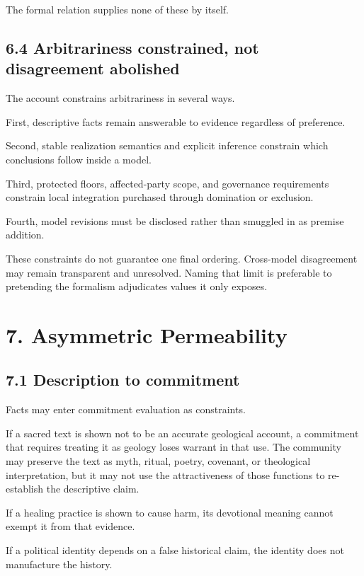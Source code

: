 \documentclass[
  11pt,
]{article}
\begin{document}
The formal relation supplies none of these by itself.

\subsection{6.4 Arbitrariness constrained, not disagreement
abolished}\label{arbitrariness-constrained-not-disagreement-abolished}

The account constrains arbitrariness in several ways.

First, descriptive facts remain answerable to evidence regardless of
preference.

Second, stable realization semantics and explicit inference constrain
which conclusions follow inside a model.

Third, protected floors, affected-party scope, and governance
requirements constrain local integration purchased through domination or
exclusion.

Fourth, model revisions must be disclosed rather than smuggled in as
premise addition.

These constraints do not guarantee one final ordering. Cross-model
disagreement may remain transparent and unresolved. Naming that limit is
preferable to pretending the formalism adjudicates values it only
exposes.

\section{7. Asymmetric Permeability}\label{asymmetric-permeability-1}

\subsection{7.1 Description to
commitment}\label{description-to-commitment}

Facts may enter commitment evaluation as constraints.

If a sacred text is shown not to be an accurate geological account, a
commitment that requires treating it as geology loses warrant in that
use. The community may preserve the text as myth, ritual, poetry,
covenant, or theological interpretation, but it may not use the
attractiveness of those functions to re-establish the descriptive claim.

If a healing practice is shown to cause harm, its devotional meaning
cannot exempt it from that evidence.

If a political identity depends on a false historical claim, the
identity does not manufacture the history.
\end{document}
